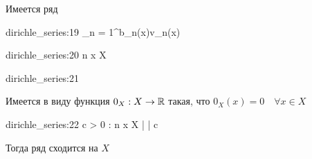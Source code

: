 \begin{theorem}
	Имеется ряд
	\begin{equ}{dirichle_series:19}
		\sum_{n = 1}^\infty b_n(x)v_n(x)
	\end{equ}
	\begin{equ}{dirichle_series:20}
		  n \quad \forall {} x \in X
	\end{equ}
	\begin{equ}{dirichle_series:21}
	\end{equ}
	\begin{note}
		Имеется в виду функция $ 0_X : X \to \mathbb{R} $ такая, что $ 0_X(x) = 0 \quad \forall x \in X $
	\end{note}
	\begin{equ}{dirichle_series:22}
		\exist c > 0 : \quad \forall n \quad \forall x \in X \quad \bigg|  \bigg| \bm\le c
	\end{equ}
	Тогда ряд   сходится на $ X $
\end{theorem}

